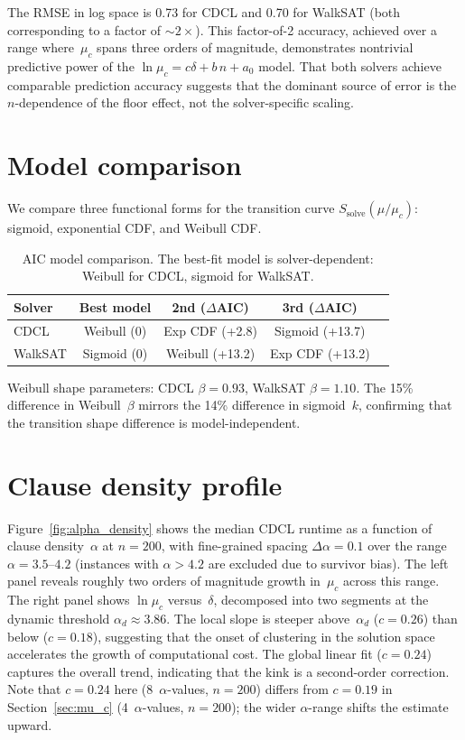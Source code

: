 \documentclass[11pt,a4paper]{article}
\newcommand{\mc}{\mu_c}
\newcommand{\Ssolve}{S_{\text{solve}}}
\begin{document}
The RMSE in log space is 0.73 for CDCL
and 0.70 for WalkSAT (both corresponding to
a factor of $\sim\!2\times$).
This factor-of-2 accuracy, achieved over a range where~$\mc$
spans three orders of magnitude, demonstrates nontrivial
predictive power of the $\ln \mc = c\delta + b\,n + a_0$ model.
That both solvers achieve comparable prediction accuracy
suggests that the dominant source of error is
the $n$-dependence of the floor effect,
not the solver-specific scaling.


\section{Model comparison}
\label{app:model}

We compare three functional forms for the transition curve
$\Ssolve(\mu/\mc)$:
sigmoid, exponential CDF, and Weibull CDF.

\begin{table}[h]
\centering
\begin{tabular}{lcccc}
\toprule
Solver & Best model & 2nd ($\Delta$AIC) & 3rd ($\Delta$AIC) \\
\midrule
CDCL    & Weibull (0) & Exp CDF (+2.8) & Sigmoid (+13.7) \\
WalkSAT & Sigmoid (0) & Weibull (+13.2) & Exp CDF (+13.2) \\
\bottomrule
\end{tabular}
\caption{AIC model comparison.
The best-fit model is solver-dependent:
Weibull for CDCL, sigmoid for WalkSAT.}
\label{tab:weibull}
\end{table}

Weibull shape parameters:
CDCL $\beta = 0.93$, WalkSAT $\beta = 1.10$.
The 15\% difference in Weibull~$\beta$ mirrors
the 14\% difference in sigmoid~$k$,
confirming that the transition shape difference is model-independent.


\section{Clause density profile}
\label{app:alpha_density}

Figure~\ref{fig:alpha_density} shows the median CDCL runtime
as a function of clause density~$\alpha$ at $n = 200$,
with fine-grained spacing $\Delta\alpha = 0.1$
over the range $\alpha = 3.5$--$4.2$ (instances with
$\alpha > 4.2$ are excluded due to survivor bias).
The left panel reveals roughly two orders of magnitude growth
in~$\mc$ across this range.
The right panel shows $\ln \mc$ versus~$\delta$, decomposed into
two segments at the dynamic threshold $\alpha_d \approx 3.86$.
The local slope is steeper above~$\alpha_d$ ($c = 0.26$) than
below ($c = 0.18$), suggesting that the onset of clustering
in the solution space~\cite{Achlioptas2008} accelerates
the growth of computational cost.
The global linear fit ($c = 0.24$) captures the overall trend,
indicating that the kink is a second-order correction.
Note that $c = 0.24$ here (8~$\alpha$-values, $n = 200$)
differs from $c = 0.19$ in Section~\ref{sec:mu_c}
(4~$\alpha$-values, $n = 200$); the wider $\alpha$-range
shifts the estimate upward.
\end{document}
